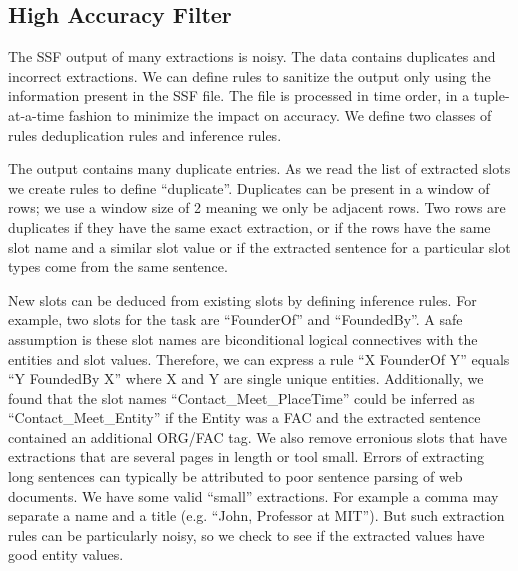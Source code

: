 \subsection{High Accuracy Filter}

The SSF output of many extractions is noisy. The data contains duplicates and 
incorrect extractions. We can define rules to sanitize the output only using 
the information present in the SSF file. The file is processed in time order, 
in a tuple-at-a-time fashion to minimize the impact on accuracy. We define 
two classes of rules deduplication rules and inference rules.

The output contains many duplicate entries. As we read the list of extracted 
slots we create rules to define ``duplicate''. Duplicates can be present in a 
window of rows; we use a window size of 2 meaning we only be adjacent rows. 
Two rows are duplicates if they have the same exact extraction, or if the 
rows have the same slot name and a similar slot value or if the extracted 
sentence for a particular slot types come from the same sentence.

 New slots can be deduced from existing slots by defining inference rules. 
 For example, two slots for the task are ``FounderOf'' and ``FoundedBy''. A safe 
 assumption is these slot names are biconditional logical connectives with the 
 entities and slot values. Therefore, we can express a rule ``X FounderOf Y'' 
 equals ``Y FoundedBy X'' where X and Y are single unique entities. Additionally,
 we found that the slot names ``Contact\_Meet\_PlaceTime'' could be inferred as
 ``Contact\_Meet\_Entity'' if the Entity was a FAC and the extracted sentence 
 contained an additional ORG/FAC tag.  
We also remove erronious slots that have extractions that are several pages in 
length or tool small. Errors of extracting long sentences can typically be 
attributed to poor sentence parsing of web documents. We have some valid
``small'' extractions. For example a comma may separate a name and a title
(e.g. ``John, Professor at MIT''). But such extraction rules can be particularly 
noisy, so we check to see if the extracted values have good entity values.




